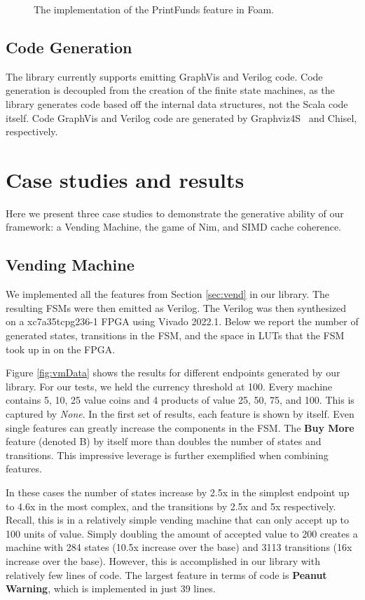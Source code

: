 \documentclass[sigplan,anonymous,review]{acmart}
\begin{document}
\begin{figure}
    \centering
    
    \caption{The implementation of the PrintFunds feature in Foam.}
    \label{lst:PrintFunds}
\end{figure}

\subsection{Code Generation}
The library currently supports emitting GraphVis and Verilog code. Code generation is decoupled from the creation of the finite state machines, as the library generates code based off the internal data structures, not the Scala code itself. Code GraphVis and Verilog code are generated by Graphviz4S~\cite{} and Chisel, respectively. 

\section{Case studies and results}\label{sec:results}
Here we present three case studies to demonstrate the generative ability of our framework: a Vending Machine, the game of Nim, and SIMD cache coherence.

\subsection{Vending Machine}\label{sec:vendresults}
We implemented all the features from Section \ref{sec:vend} in our library. The resulting FSMs were then emitted as Verilog. The Verilog was then synthesized on a xc7a35tcpg236-1 FPGA using Vivado 2022.1. Below we report the number of generated states, transitions in the FSM, and the space in LUTs that the FSM took up in on the FPGA.

Figure \ref{fig:vmData} shows the results for different endpoints generated by our library. For our tests, we held the currency threshold at 100. Every machine contains 5, 10, 25 value coins and 4 products of value 25, 50, 75, and 100. This is captured by \textit{None}. In the first set of results, each feature is shown by itself. Even single features can greatly increase the components in the FSM. The \textbf{Buy More} feature (denoted B) by itself more than doubles the number of states and transitions. This impressive leverage is further exemplified when combining features. 

In these cases the number of states increase by 2.5x in the simplest endpoint up to 4.6x in the most complex, and the transitions by 2.5x and 5x respectively. Recall, this is in a relatively simple vending machine that can only accept up to 100 units of value. Simply doubling the amount of accepted value to 200 creates a machine with 284 states (10.5x increase over the base) and 3113 transitions (16x increase over the base). However, this is accomplished in our library with relatively few lines of code. The largest feature in terms of code is \textbf{Peanut Warning}, which is implemented in just 39 lines. 
\end{document}
